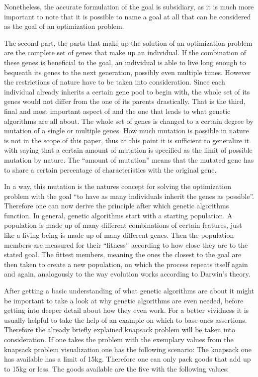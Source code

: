 \documentclass[11pt,a4paper]{article}
\begin{document}
Nonetheless, the accurate formulation of the goal is subsidiary, as it is much more important to note that it is possible to name a goal at all that can be considered as the goal of an optimization problem.

The second part, the parts that make up the solution of an optimization problem are the complete set of genes that make up an individual. If the combination of these genes is beneficial to the goal, an individual is able to live long enough to bequeath its genes to the next generation, possibly even multiple times. However the restrictions of nature have to be taken into consideration. Since each individual already inherits a certain gene pool to begin with, the whole set of its genes would not differ from the one of its parents drastically. 
That is the third, final and most important aspect of and the one that leads to what genetic algorithms are all about. The whole set of genes is changed to a certain degree by mutation of a single or multiple genes. How much mutation is possible in nature is not in the scope of this paper, thus at this point it is sufficient to generalize it with saying that a certain amount of mutation is specified as the limit of possible mutation by nature. The “amount of mutation” means that the mutated gene has to share a certain percentage of characteristics with the original gene.

In a way, this mutation is the natures concept for solving the optimization problem with the goal “to have as many individuals inherit the genes as possible”. Therefore one can now derive the principle after which genetic algorithms function. In general, genetic algorithms start with a starting population. A population is made up of many different combinations of certain features, just like a living being is made up of many different genes. Then the population members are measured for their “fitness” according to how close they are to the stated goal. The fittest members, meaning the ones the closest to the goal are then taken to create a new population, on which the process repeats itself again and again, analogously to the way evolution works according to Darwin’s theory.

After getting a basic understanding of what genetic algorithms are about it might be important to take a look at why genetic algorithms are even needed, before getting into deeper detail about how they even work.
For a better vividness it is usually helpful to take the help of an example on which to base ones assertions. Therefore the already briefly explained knapsack problem will be taken into consideration.
If one takes the problem with the exemplary values from the knapsack problem visualization one has the following scenario:
The knapsack one has available has a limit of 15kg. Therefore one can only pack goods that add up to 15kg or less.
The goods available are the five with the following values:
\end{document}
